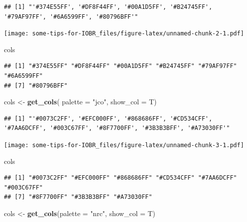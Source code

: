 \documentclass[
  12pt,
]{book}
\newenvironment{Shaded}{\begin{snugshade}}{\end{snugshade}}
\newcommand{\AttributeTok}[1]{\textcolor[rgb]{0.13,0.29,0.53}{#1}}
\newcommand{\FunctionTok}[1]{\textcolor[rgb]{0.13,0.29,0.53}{\textbf{#1}}}
\newcommand{\NormalTok}[1]{#1}
\newcommand{\OtherTok}[1]{\textcolor[rgb]{0.56,0.35,0.01}{#1}}
\newcommand{\StringTok}[1]{\textcolor[rgb]{0.31,0.60,0.02}{#1}}
\begin{document}
\begin{verbatim}
## [1] "'#374E55FF', '#DF8F44FF', '#00A1D5FF', '#B24745FF', '#79AF97FF', '#6A6599FF', '#80796BFF'"
\end{verbatim}

\texttt{[image: some-tips-for-IOBR\_files/figure-latex/unnamed-chunk-2-1.pdf]}

\begin{Shaded}
\begin{Highlighting}[]
\NormalTok{cols}
\end{Highlighting}
\end{Shaded}

\begin{verbatim}
## [1] "#374E55FF" "#DF8F44FF" "#00A1D5FF" "#B24745FF" "#79AF97FF" "#6A6599FF"
## [7] "#80796BFF"
\end{verbatim}

\begin{Shaded}
\begin{Highlighting}[]
\NormalTok{cols }\OtherTok{\textless{}{-}} \FunctionTok{get\_cols}\NormalTok{( }\AttributeTok{palette =} \StringTok{"jco"}\NormalTok{, }\AttributeTok{show\_col =}\NormalTok{ T)}
\end{Highlighting}
\end{Shaded}

\begin{verbatim}
## [1] "'#0073C2FF', '#EFC000FF', '#868686FF', '#CD534CFF', '#7AA6DCFF', '#003C67FF', '#8F7700FF', '#3B3B3BFF', '#A73030FF'"
\end{verbatim}

\texttt{[image: some-tips-for-IOBR\_files/figure-latex/unnamed-chunk-3-1.pdf]}

\begin{Shaded}
\begin{Highlighting}[]
\NormalTok{cols}
\end{Highlighting}
\end{Shaded}

\begin{verbatim}
## [1] "#0073C2FF" "#EFC000FF" "#868686FF" "#CD534CFF" "#7AA6DCFF" "#003C67FF"
## [7] "#8F7700FF" "#3B3B3BFF" "#A73030FF"
\end{verbatim}

\begin{Shaded}
\begin{Highlighting}[]
\NormalTok{cols }\OtherTok{\textless{}{-}} \FunctionTok{get\_cols}\NormalTok{(}\AttributeTok{palette =} \StringTok{"nrc"}\NormalTok{, }\AttributeTok{show\_col =}\NormalTok{ T)}
\end{Highlighting}
\end{Shaded}
\end{document}
